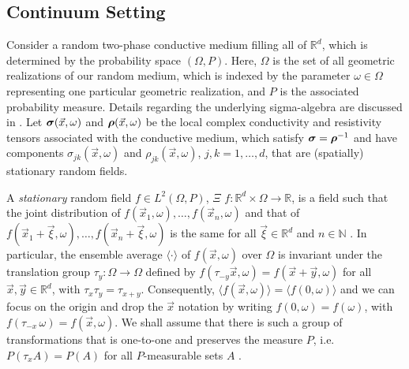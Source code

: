 \documentclass{cmslatex}
\newcommand\bsig{\mbox{\boldmath${\sigma}$}}
\newcommand\brho{\mbox{\boldmath${\rho}$}}
\begin{document}
\subsection{Continuum Setting}\label{sec:Continuum_Setting}
%
Consider a random two-phase conductive medium filling all of
$\mathbb{R}^d$, which is determined by the probability space
$(\Omega,P)$. Here, $\Omega$ is the set of all  geometric realizations of our
random medium, which is indexed by the parameter $\omega\in\Omega$ representing
one particular geometric realization, and $P$ is the associated
probability measure. Details regarding the underlying sigma-algebra
are discussed in \cite{Papanicolaou:RF-835}. Let $\bsig(\vec{x},\omega)$
and $\brho(\vec{x},\omega)$ be the local complex conductivity and
resistivity tensors associated with the conductive medium, which
satisfy $\bsig=\brho^{-1}$ and have components $\sigma_{jk}(\vec{x},\omega)$ and
$\rho_{jk}(\vec{x},\omega)$, $j,k=1,\ldots,d$, that are (spatially) stationary
random fields. 


A \emph{stationary} random field $f\in L^2(\Omega,P)$, $\Xi$
$f:\mathbb{R}^d\times\Omega\to\mathbb{R}$, is a field such that the 
joint distribution of $f(\vec{x}_1,\omega),\ldots,f(\vec{x}_n,\omega)$ and that of
$f(\vec{x}_1+\vec{\xi},\omega),\ldots,f(\vec{x}_n+\vec{\xi},\omega)$ is the same for all
$\vec{\xi}\in\mathbb{R}^d$ and $n\in\mathbb{N}$
\cite{Golden:CMP-473,Papanicolaou:RF-835}. In particular, the ensemble
average $\langle\cdot\rangle$ of $f(\vec{x},\omega)$ over $\Omega$ is 
invariant under the translation group $\tau_y:\Omega\to\Omega$ defined by
$f(\tau_{-y}\vec{x},\omega)=f(\vec{x}+\vec{y},\omega)$ for all
$\vec{x},\vec{y}\in\mathbb{R}^d$, with $\tau_x\tau_y=\tau_{x+y}$. Consequently, 
$\langle f(\vec{x},\omega)\rangle=\langle f(0,\omega)\rangle$ and we can focus on the origin and drop the
$\vec{x}$ notation by writing $f(0,\omega)=f(\omega)$, with
$f(\tau_{-x}\,\omega)=f(\vec{x},\omega)$. We shall assume that there is such a group
of transformations that is one-to-one and preserves the measure $P$,
i.e. $P(\tau_xA)=P(A)$ for all $P$-measurable sets $A$
\cite{Golden:CMP-473,Papanicolaou:RF-835}.
\end{document}
